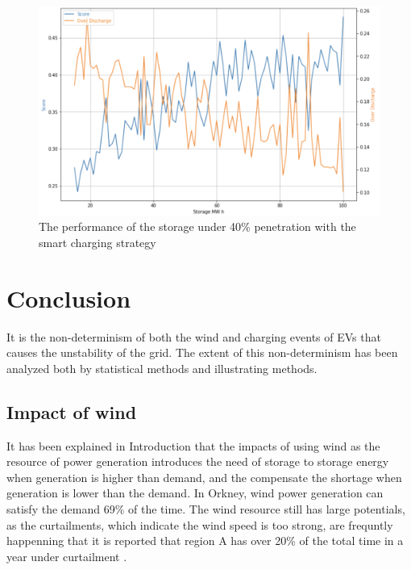\documentclass[12pt,a4paper]{report}
\begin{document}
            \begin{figure}[ht]
                \centerline{\includegraphics[scale=0.9]{simu_score_smart_40}}
                \caption{The performance of the storage under 40\% penetration with the smart charging strategy}
                \label{fig_simu_score_smart_40}
            \end{figure}

    \chapter{Conclusion}
    It is the non-determinism of both the wind and charging events of EVs that causes the unstability of the grid. The extent of this non-determinism has been analyzed both by statistical methods and illustrating methods. 
        \section{Impact of wind}
        It has been explained in Introduction that the impacts of using wind as the resource of power generation introduces the need of storage to storage energy when generation is higher than demand, and the compensate the shortage when generation is lower than the demand. In Orkney, wind power generation can satisfy the demand 69\% of the time. The wind resource still has large potentials, as the curtailments, which indicate the wind speed is too strong, are frequntly happenning that it is reported that region A has over 20\% of the total time in a year under curtailment \cite{report:OrkneyAudit}.
\end{document}
